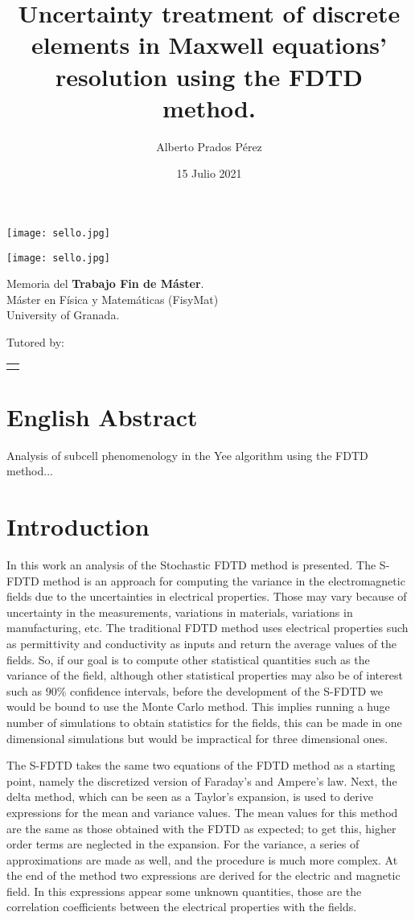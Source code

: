 \documentclass[12pt, oneside]{book}
\title{Uncertainty treatment of discrete elements in Maxwell equations' resolution using the FDTD method.}
\author{Alberto Prados Pérez}
\date{15 Julio 2021}
\makeatletter
\renewcommand\maketitle{%
  \begin{titlepage}
      \vspace*{1.5cm}
      \parskip=0pt
      \Huge\bfseries
      \begin{center}
          \leavevmode\texttt{[image: sello.jpg]}\\[2cm]
          \@title
      \end{center}
      \vspace{1cm}
      \begin{center}
          \@author
      \end{center}
  \end{titlepage}
  
  \begin{titlepage}
  \parindent=0pt
  \begin{flushleft}
  \vspace*{1.5mm}
  \setlength\baselineskip{0pt}
  \setlength\parskip{0mm}
  \begin{center}
      \leavevmode\texttt{[image: sello.jpg]}
  \end{center}
  \end{flushleft}
  \vspace{1cm}
  \bgroup
  \Large \bfseries
  \begin{center}
  \@title
  \end{center}
  \egroup
  \vspace*{.5cm}
  \begin{center}
  \@author
  \end{center}
  \vspace*{1.8cm}
  \begin{flushright}
  \begin{minipage}{8.45cm}
      Memoria del {\bf Trabajo Fin de Máster}.\\ 
      Máster en Física y Matemáticas (FisyMat) \\ 
      University of Granada.

      \vspace*{7.5mm}

      Tutored by:
  \end{minipage}\par
  \begin{tabularx}{8.45cm}[b]{@{}l}
      \guardatutores
  \end{tabularx}
   \end{flushright}
      \vspace*{\fill}
   \end{titlepage}
   \pagestyle{tfg}
   \renewcommand{\chaptermark}[1]{\markright{\thechapter.\space ##1}}
   \renewcommand{\sectionmark}[1]{}
   \renewcommand{\subsectionmark}[1]{}
  }
\makeatother
\begin{document}
\maketitle

\frontmatter
\tableofcontents

\mainmatter

\chapter*{English Abstract}



\begin{otherlanguage}{english}
    Analysis of subcell phenomenology in the Yee algorithm using the FDTD method...
\end{otherlanguage}

\chapter{Introduction}
In this work an analysis of the Stochastic FDTD method is presented. The S-FDTD method is an approach for computing the variance in the electromagnetic fields due to the uncertainties in electrical properties. Those may vary because of uncertainty in the measurements, variations in materials, variations in manufacturing, etc.
The traditional FDTD method uses electrical properties such as permittivity and conductivity as inputs and return the average values of the fields. So, if our goal is to compute other statistical quantities such as the variance of the field, although other statistical properties may also be of interest such as $90\%$ confidence intervals, before the development of the S-FDTD we would be bound to use the Monte Carlo method. This implies running a huge number of simulations to obtain statistics for the fields, this can be made in one dimensional simulations but would be impractical for three dimensional ones.

The S-FDTD takes the same two equations of the FDTD method as a starting point, namely the discretized version of Faraday's and Ampere's law. Next, the delta method, which can be seen as a Taylor's expansion, is used to derive expressions for the mean and variance values. The mean values for this method are the same as those obtained with the FDTD as expected; to get this, higher order terms are neglected in the expansion. For the variance, a series of approximations are made as well, and the procedure is much more complex. At the end of the method two expressions are derived for the electric and magnetic field. In this expressions appear some unknown quantities, those are the correlation coefficients between the electrical properties with the fields. 
\end{document}
